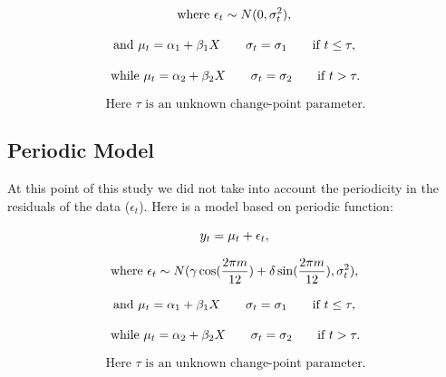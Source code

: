 \documentclass[12pt, titlepage]{article}
\begin{document}
\begin{displaymath}
 \text{where } \epsilon_t \sim {N}(0,\sigma_t^2), \\
\end{displaymath}

\begin{displaymath}
 \text{and }  \mu_t = \alpha_1+\beta_1 X \qquad \sigma_t = \sigma_1 \qquad \text{if } t \leq \tau, \\
\end{displaymath}

\begin{displaymath}
 \text{while } \mu_t = \alpha_2+\beta_2 X \qquad \sigma_t = \sigma_2 \qquad \text{if } t > \tau.\\
\end{displaymath}

\begin{displaymath}
 \text{Here } \tau \text{ is an unknown change-point parameter.}
\end{displaymath}
\subsection{Periodic Model}
At this point of this study we did not take into account the periodicity in the residuals of the data ($\epsilon_t$). Here is a model based on periodic function: 

\begin{displaymath}
 y_t = \mu_t + \epsilon_t, \\ 
\end{displaymath}

\begin{displaymath}
 \text{where } \epsilon_t \sim {N}(\gamma \cos(\frac{2\pi m}{12}) + \delta \sin(\frac{2\pi m}{12}),\sigma_t^2), \\
\end{displaymath}

\begin{displaymath}
 \text{and }  \mu_t = \alpha_1+\beta_1 X \qquad \sigma_t = \sigma_1 \qquad \text{if } t \leq \tau, \\
\end{displaymath}

\begin{displaymath}
 \text{while } \mu_t = \alpha_2+\beta_2 X \qquad \sigma_t = \sigma_2 \qquad \text{if } t > \tau.\\
\end{displaymath}

\begin{displaymath}
 \text{Here } \tau \text{ is an unknown change-point parameter.}
\end{displaymath}
\end{document}
